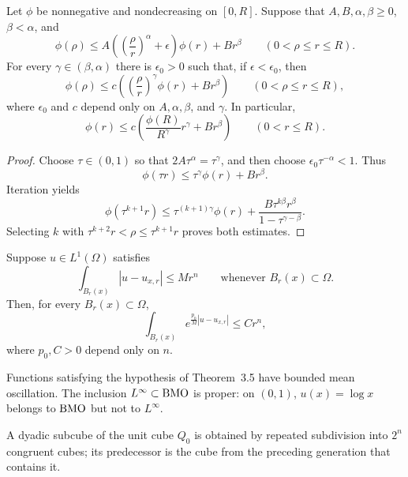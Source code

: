 \begin{lemma}\label{hanlin:weaksol-part1-lemma-3-4}
Let $\phi$ be nonnegative and nondecreasing on $[0,R]$. Suppose that
$A,B,\alpha,\beta\geq0$, $\beta<\alpha$, and
\[
\phi(\rho)\leq A\left(\left(\frac{\rho}{r}\right)^\alpha
+\epsilon\right)\phi(r)+Br^\beta
\qquad(0<\rho\leq r\leq R).
\]
For every $\gamma\in(\beta,\alpha)$ there is $\epsilon_0>0$ such that,
if $\epsilon<\epsilon_0$, then
\[
\phi(\rho)\leq c\left(
\left(\frac{\rho}{r}\right)^\gamma\phi(r)+Br^\beta\right)
\qquad(0<\rho\leq r\leq R),
\]
where $\epsilon_0$ and $c$ depend only on $A,\alpha,\beta$, and $\gamma$.
In particular,
\[
\phi(r)\leq c\left(\frac{\phi(R)}{R^\gamma}r^\gamma+Br^\beta\right)
\qquad(0<r\leq R).
\]
\end{lemma}
\begin{proof}
\sketch Choose $\tau\in(0,1)$ so that
$2A\tau^\alpha=\tau^\gamma$, and then choose
$\epsilon_0\tau^{-\alpha}<1$. Thus
\[
\phi(\tau r)\leq\tau^\gamma\phi(r)+Br^\beta.
\]
Iteration yields
\[
\phi(\tau^{k+1}r)
\leq\tau^{(k+1)\gamma}\phi(r)
+\frac{B\tau^{k\beta}r^\beta}{1-\tau^{\gamma-\beta}}.
\]
Selecting $k$ with $\tau^{k+2}r<\rho\leq\tau^{k+1}r$ proves both
estimates.
\end{proof}

\begin{theorem}\label{hanlin:weaksol-part1-john-nirenberg}
Suppose $u\in L^1(\Omega)$ satisfies
\[
\int_{B_r(x)}|u-u_{x,r}|\leq Mr^n
\qquad\text{whenever }B_r(x)\subset\Omega.
\]
Then, for every $B_r(x)\subset\Omega$,
\[
\int_{B_r(x)}e^{\frac{p_0}{M}|u-u_{x,r}|}\leq Cr^n,
\]
where $p_0,C>0$ depend only on $n$.
\end{theorem}

\begin{remark}\label{hanlin:weaksol-part1-bmo}
Functions satisfying the hypothesis of Theorem~3.5 have bounded mean
oscillation. The inclusion $L^\infty\subset\mathrm{BMO}$ is proper: on $(0,1)$,
$u(x)=\log x$ belongs to $\mathrm{BMO}$ but not to $L^\infty$.
\end{remark}

A dyadic subcube of the unit cube $Q_0$ is obtained by repeated subdivision
into $2^n$ congruent cubes; its predecessor is the cube from the preceding
generation that contains it.

